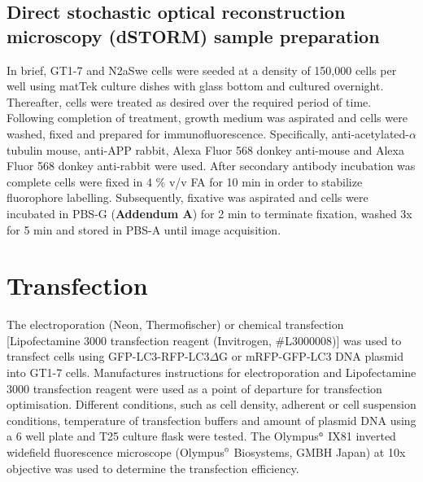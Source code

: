 \subsection{Direct stochastic optical reconstruction microscopy (dSTORM) sample preparation}
In brief, GT1-7 and N2aSwe cells were seeded at a density of 150,000 cells per well using matTek culture dishes with glass bottom and cultured overnight. Thereafter, cells were treated as desired over the required period of time. Following completion of treatment, growth medium was aspirated and cells were washed, fixed and prepared for immunofluorescence. Specifically, anti-acetylated-$\alpha$ tubulin mouse, anti-APP rabbit, Alexa Fluor 568 donkey anti-mouse and Alexa Fluor 568 donkey anti-rabbit were used. After secondary antibody incubation was complete cells were fixed in 4 \% v/v FA for 10 min in order to stabilize fluorophore labelling. Subsequently, fixative was aspirated and cells were incubated in PBS-G (\textbf{Addendum A}) for 2 min to terminate fixation, washed 3x for 5 min and stored in PBS-A until image acquisition. 

\section{Transfection}\label{sec:transfection}
The electroporation (Neon, Thermofischer) or chemical transfection [Lipofectamine 3000 transfection reagent (Invitrogen, \#L3000008)] was used to transfect cells using GFP-LC3-RFP-LC3$\Delta$G or mRFP-GFP-LC3 DNA plasmid into  GT1-7 cells. Manufactures instructions for electroporation and Lipofectamine 3000 transfection reagent were used as a point of departure for transfection optimisation. Different conditions, such as cell density, adherent or cell suspension conditions, temperature of transfection buffers and amount of plasmid DNA  using a 6 well plate and T25 culture flask were tested. The Olympus${\textsuperscript{\tiny{\textregistered}}}$ IX81 inverted widefield fluorescence microscope (Olympus${\textsuperscript{\tiny{\textregistered}}}$ Biosystems, GMBH Japan) at 10x objective was used to determine the transfection efficiency.

